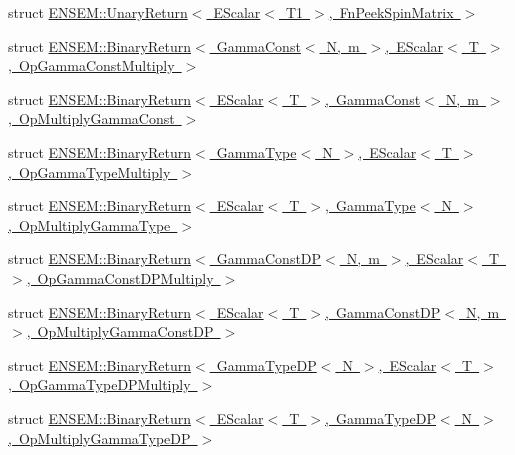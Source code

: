 \begin{DoxyCompactItemize}
struct \mbox{\hyperlink{structENSEM_1_1UnaryReturn_3_01EScalar_3_01T1_01_4_00_01FnPeekSpinMatrix_01_4}{E\+N\+S\+E\+M\+::\+Unary\+Return$<$ E\+Scalar$<$ T1 $>$, Fn\+Peek\+Spin\+Matrix $>$}}
\item 
struct \mbox{\hyperlink{structENSEM_1_1BinaryReturn_3_01GammaConst_3_01N_00_01m_01_4_00_01EScalar_3_01T_01_4_00_01OpGammaConstMultiply_01_4}{E\+N\+S\+E\+M\+::\+Binary\+Return$<$ Gamma\+Const$<$ N, m $>$, E\+Scalar$<$ T $>$, Op\+Gamma\+Const\+Multiply $>$}}
\item 
struct \mbox{\hyperlink{structENSEM_1_1BinaryReturn_3_01EScalar_3_01T_01_4_00_01GammaConst_3_01N_00_01m_01_4_00_01OpMultiplyGammaConst_01_4}{E\+N\+S\+E\+M\+::\+Binary\+Return$<$ E\+Scalar$<$ T $>$, Gamma\+Const$<$ N, m $>$, Op\+Multiply\+Gamma\+Const $>$}}
\item 
struct \mbox{\hyperlink{structENSEM_1_1BinaryReturn_3_01GammaType_3_01N_01_4_00_01EScalar_3_01T_01_4_00_01OpGammaTypeMultiply_01_4}{E\+N\+S\+E\+M\+::\+Binary\+Return$<$ Gamma\+Type$<$ N $>$, E\+Scalar$<$ T $>$, Op\+Gamma\+Type\+Multiply $>$}}
\item 
struct \mbox{\hyperlink{structENSEM_1_1BinaryReturn_3_01EScalar_3_01T_01_4_00_01GammaType_3_01N_01_4_00_01OpMultiplyGammaType_01_4}{E\+N\+S\+E\+M\+::\+Binary\+Return$<$ E\+Scalar$<$ T $>$, Gamma\+Type$<$ N $>$, Op\+Multiply\+Gamma\+Type $>$}}
\item 
struct \mbox{\hyperlink{structENSEM_1_1BinaryReturn_3_01GammaConstDP_3_01N_00_01m_01_4_00_01EScalar_3_01T_01_4_00_01OpGammaConstDPMultiply_01_4}{E\+N\+S\+E\+M\+::\+Binary\+Return$<$ Gamma\+Const\+D\+P$<$ N, m $>$, E\+Scalar$<$ T $>$, Op\+Gamma\+Const\+D\+P\+Multiply $>$}}
\item 
struct \mbox{\hyperlink{structENSEM_1_1BinaryReturn_3_01EScalar_3_01T_01_4_00_01GammaConstDP_3_01N_00_01m_01_4_00_01OpMultiplyGammaConstDP_01_4}{E\+N\+S\+E\+M\+::\+Binary\+Return$<$ E\+Scalar$<$ T $>$, Gamma\+Const\+D\+P$<$ N, m $>$, Op\+Multiply\+Gamma\+Const\+D\+P $>$}}
\item 
struct \mbox{\hyperlink{structENSEM_1_1BinaryReturn_3_01GammaTypeDP_3_01N_01_4_00_01EScalar_3_01T_01_4_00_01OpGammaTypeDPMultiply_01_4}{E\+N\+S\+E\+M\+::\+Binary\+Return$<$ Gamma\+Type\+D\+P$<$ N $>$, E\+Scalar$<$ T $>$, Op\+Gamma\+Type\+D\+P\+Multiply $>$}}
\item 
struct \mbox{\hyperlink{structENSEM_1_1BinaryReturn_3_01EScalar_3_01T_01_4_00_01GammaTypeDP_3_01N_01_4_00_01OpMultiplyGammaTypeDP_01_4}{E\+N\+S\+E\+M\+::\+Binary\+Return$<$ E\+Scalar$<$ T $>$, Gamma\+Type\+D\+P$<$ N $>$, Op\+Multiply\+Gamma\+Type\+D\+P $>$}}
\end{DoxyCompactItemize}
